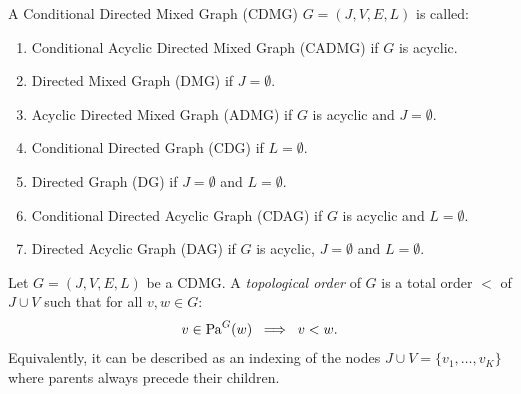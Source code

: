 \begin{defmark}
\begin{Def}
    A  Conditional Directed Mixed Graph (CDMG)  $G=(J,V,E,L)$  is called:
   \begin{enumerate}
       \item Conditional Acyclic Directed Mixed Graph (CADMG) if $G$ is acyclic.
       \item Directed Mixed Graph (DMG) if $J = \emptyset$.
       \item Acyclic Directed Mixed Graph (ADMG) if $G$ is acyclic and $J = \emptyset$.
       \item Conditional Directed Graph (CDG) if $L = \emptyset$.
       \item Directed Graph (DG) if $J = \emptyset$ and $L = \emptyset$.
       \item Conditional Directed Acyclic Graph (CDAG) if $G$ is acyclic and $L = \emptyset$.
       \item Directed Acyclic Graph (DAG) if $G$ is acyclic, $J=\emptyset$ and $L = \emptyset$.
   \end{enumerate}
\end{Def}
\end{defmark}

\begin{defmark}
\begin{Def}
    Let $G=(J,V,E,L)$ be a CDMG.
    A \emph{topological order} of $G$ is a total order $<$ of $J \cup V$ such that for all $v,w \in G$:
    \[ v \in \mathrm{Pa}^G(w) \; \implies \; v < w.\]
    Equivalently, it can be described as an indexing of the nodes $J \cup V = \{v_1,\dots,v_K\}$ where parents always precede their children.
\end{Def}
\end{defmark}

